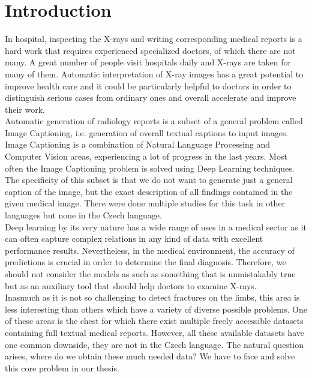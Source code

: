 \chapter*{Introduction}

In hospital, inspecting the X-rays and writing corresponding medical reports is a hard work that requires experienced specialized doctors, of which there are not many. A great number of people visit hospitals daily and X-rays are taken for many of them. Automatic interpretation of X-ray images has a great potential to improve health care and it could be particularly helpful to doctors in order to distinguish serious cases from ordinary ones and overall accelerate and improve their work.\\

Automatic generation of radiology reports is a subset of a general problem called Image Captioning, i.e. generation of overall textual captions to input images. Image Captioning is a combination of Natural Language Processing and Computer Vision areas, experiencing a lot of progress in the last years. Most often the Image Captioning problem is solved using Deep Learning techniques. The specificity of this subset is that we do not want to generate just a general caption of the image, but the exact description of all findings contained in the given medical image. There were done multiple studies for this task in other languages but none in the Czech language.\\

Deep learning by its very nature has a wide range of uses in a medical sector as it can often capture complex relations in any kind of data with excellent performance results. Nevertheless, in the medical environment, the accuracy of predictions is crucial in order to determine the final diagnosis. Therefore, we should not consider the models as such as something that is unmistakably true but as an auxiliary tool that should help doctors to examine X-rays.\\

Inasmuch as it is not so challenging to detect fractures on the limbs, this area is less interesting than others which have a variety of diverse possible problems. One of these areas is the chest for which there exist multiple freely accessible datasets containing full textual medical reports. However, all these available datasets have one common downside, they are not in the Czech language. The natural question arises, where do we obtain these much needed data? We have to face and solve this core problem in our thesis.\\

